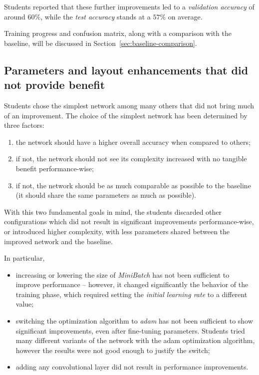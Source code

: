 \documentclass[a4paper, 11pt]{article} %
\begin{document}
Students reported that these further improvements led to a \emph{validation accuracy} of around $60\%$, while the \emph{test accuracy} stands at a $57\%$ on average.

Training progress and confusion matrix, along with a comparison with the baseline, will be discussed in Section~\ref{sec:baseline-comparison}.

\subsection{Parameters and layout enhancements that did not provide benefit}\label{sec:no-benefits}

Students chose the simplest network among many others that did not bring much of an improvement. The choice of the simplest network has been determined by three factors:

\begin{enumerate}
    \item the network should have a higher overall accuracy when compared to others;
    \item if not, the network should not see its complexity increased with no tangible benefit performance-wise;
    \item if not, the network should be as much comparable as possible to the baseline (it should share the same parameters as much as possible).
\end{enumerate}

With this two fundamental goals in mind, the students discarded other configurations which did not result in significant improvements performance-wise, or introduced higher complexity, with less parameters shared between the improved network and the baseline.

In particular,

\begin{itemize}
    \item increasing or lowering the size of \emph{MiniBatch} has not been sufficient to improve performance \--- however, it changed significantly the behavior of the training phase, which required setting the \emph{initial learning rate} to a different value;
    \item switching the optimization algorithm to \emph{adam} has not been sufficient to show significant improvements, even after fine-tuning parameters. Students tried many different variants of the network with the adam optimization algorithm, however the results were not good enough to justify the switch;
    \item adding any convolutional layer did not result in performance improvements.
\end{itemize}
\end{document}
